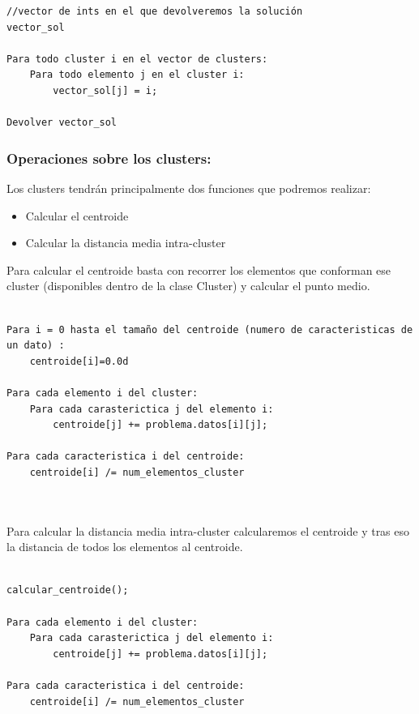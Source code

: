 \documentclass[12pt, spanish]{article}
\begin{document}
\begin{lstlisting}
//vector de ints en el que devolveremos la solución
vector_sol 

Para todo cluster i en el vector de clusters:
	Para todo elemento j en el cluster i:
		vector_sol[j] = i;
		
Devolver vector_sol

\end{lstlisting}


\subsubsection{Operaciones sobre los clusters:}

Los clusters tendrán principalmente dos funciones que podremos realizar:

\begin{itemize}
	\item {Calcular el centroide}
	\item {Calcular la distancia media intra-cluster}
\end{itemize}

Para calcular el centroide basta con recorrer los elementos que conforman ese cluster (disponibles dentro de la clase Cluster) y calcular el punto medio.

\begin{lstlisting}

Para i = 0 hasta el tamaño del centroide (numero de caracteristicas de un dato) :
	centroide[i]=0.0d
	
Para cada elemento i del cluster:
	Para cada carasterictica j del elemento i:
		centroide[j] += problema.datos[i][j];
		
Para cada caracteristica i del centroide:
	centroide[i] /= num_elementos_cluster 
	
	
\end{lstlisting}

Para calcular la distancia media intra-cluster calcularemos el centroide y tras eso la distancia de todos los elementos al centroide.


\begin{lstlisting}

calcular_centroide();
	
Para cada elemento i del cluster:
	Para cada carasterictica j del elemento i:
		centroide[j] += problema.datos[i][j];
		
Para cada caracteristica i del centroide:
	centroide[i] /= num_elementos_cluster 
	
	
\end{lstlisting}
\end{document}
